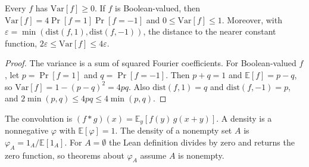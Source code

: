 \begin{proposition}
  \label{prop:analysis-variance-boolean}
  \leanok
  Every $f$ has $\mathrm{Var}[f] \ge 0$. If $f$ is Boolean-valued, then
  $\mathrm{Var}[f] = 4 \Pr[f = 1] \Pr[f = -1]$ and
  $0 \le \mathrm{Var}[f] \le 1$. Moreover, with
  $\varepsilon = \min(\mathrm{dist}(f, 1), \mathrm{dist}(f, -1))$, the distance
  to the nearer constant function,
  $2\varepsilon \le \mathrm{Var}[f] \le 4\varepsilon$.
\end{proposition}
\begin{proof}
  \leanok
  The variance is a sum of squared Fourier coefficients. For Boolean-valued $f$,
  let $p = \Pr[f = 1]$ and $q = \Pr[f = -1]$. Then $p + q = 1$ and
  $\mathbb{E}[f] = p - q$, so $\mathrm{Var}[f] = 1 - (p - q)^2 = 4pq$. Also
  $\mathrm{dist}(f, 1) = q$ and $\mathrm{dist}(f, -1) = p$, and
  $2\min(p,q) \le 4pq \le 4\min(p,q)$.
\end{proof}

\begin{definition}
  \label{def:analysis-convolution}
  \leanok
  The convolution is $(f * g)(x) = \mathbb{E}_y[f(y)\,g(x + y)]$. A density is a
  nonnegative $\varphi$ with $\mathbb{E}[\varphi] = 1$. The density of a nonempty
  set $A$ is $\varphi_A = 1_A / \mathbb{E}[1_A]$. For $A = \emptyset$ the Lean
  definition divides by zero and returns the zero function, so theorems about
  $\varphi_A$ assume $A$ is nonempty.
\end{definition}

